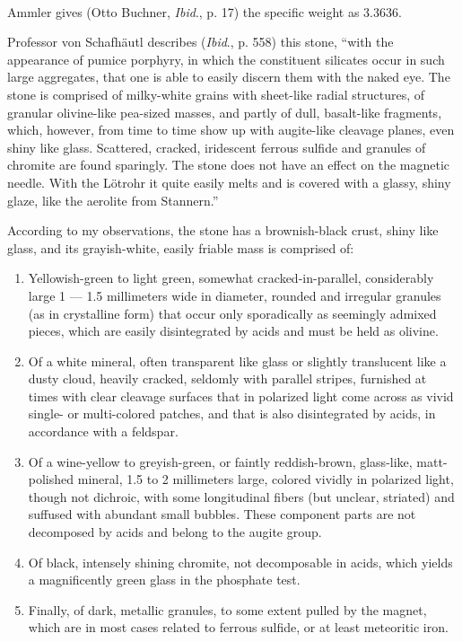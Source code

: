 \documentclass[a4paper, 12pt, oneside]{article}
\begin{document}
\paragraph*{}
Ammler gives (Otto Buchner, \emph{Ibid}., p. 17) the specific weight as 3.3636.

Professor von Schafhäutl describes (\emph{Ibid}., p. 558) this stone, ``with the appearance of pumice porphyry, in which the constituent silicates occur in such large aggregates, that one is able to easily discern them with the naked eye. The stone is comprised of milky-white grains with sheet-like radial structures, of granular olivine-like pea-sized masses, and partly of dull, basalt-like fragments, which, however, from time to time show up with augite-like cleavage planes, even shiny like glass. Scattered, cracked, iridescent ferrous sulfide and granules of chromite are found sparingly. The stone does not have an effect on the magnetic needle. With the Lötrohr it quite easily melts and is covered with a glassy, shiny glaze, like the aerolite from Stannern.''

According to my observations, the stone has a brownish-black crust, shiny like glass, and its grayish-white, easily friable mass is comprised of:
\begin{enumerate}
    \item Yellowish-green to light green, somewhat cracked-in-parallel, considerably large 1 --- 1.5 millimeters wide in diameter, rounded and irregular granules (as in crystalline form) that occur only sporadically as seemingly admixed pieces, which are easily disintegrated by acids and must be held as olivine.
    \item Of a white mineral, often transparent like glass or slightly translucent like a dusty cloud, heavily cracked, seldomly with parallel stripes, furnished at times with clear cleavage surfaces that in polarized light come across as vivid single- or multi-colored patches, and that is also disintegrated by acids, in accordance with a feldspar.
    \item Of a wine-yellow to greyish-green, or faintly reddish-brown, glass-like, matt-polished mineral, 1.5 to 2 millimeters large, colored vividly in polarized light, though not dichroic, with some longitudinal fibers (but unclear, striated) and suffused with abundant small bubbles. These component parts are not decomposed by acids and belong to the augite group.
    \item Of black, intensely shining chromite, not decomposable in acids, which yields a magnificently green glass in the phosphate test.
    \item Finally, of dark, metallic granules, to some extent pulled by the magnet, which are in most cases related to ferrous sulfide, or at least meteoritic iron.
\end{enumerate}
\end{document}
